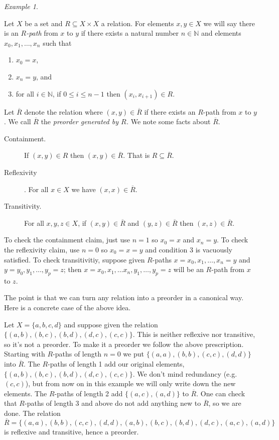 \documentclass{book}
\def\NN{{\mathbb N}}
\def\ss{\subseteq}
\def\ol{\overline}
\theoremstyle{remark}
\newtheorem{example}[subsubsection]{Example}
\theoremstyle{definition}
\begin{document}
\begin{example}\label{ex:preorder generated}

Let $X$ be a set and $R\ss X\times X$ a relation. For elements $x,y\in X$ we will say there is an {\em $R$-path} from $x$ to $y$ if there exists a natural number $n\in\NN$ and elements $x_0,x_1,\ldots,x_n$ such that
\begin{enumerate}
\item $x_0=x$,
\item $x_n=y$, and
\item for all $i\in\NN$, if $0\leq i\leq n-1$ then $(x_i,x_{i+1})\in R$.
\end{enumerate}
Let $\ol{R}$ denote the relation where $(x,y)\in\ol{R}$ if there exists an $R$-path from $x$ to $y$. We call $\ol{R}$ the {\em preorder generated by $R$.} We note some facts about $\ol{R}$.
\begin{description}
\item[Containment.] If $(x,y)\in R$ then $(x,y)\in\ol{R}$. That is $R\ss\ol{R}$.
\item[Reflexivity]. For all $x\in X$ we have $(x,x)\in\ol{R}$. 
\item[Transitivity.] For all $x,y,z\in X$, if $(x,y)\in\ol{R}$ and $(y,z)\in\ol{R}$ then $(x,z)\in\ol{R}$.
\end{description}
To check the containment claim, just use $n=1$ so $x_0=x$ and $x_n=y$. To check the reflexivity claim, use $n=0$ so $x_0=x=y$ and condition 3 is vacuously satisfied. To check transitivitiy, suppose given $R$-paths $x=x_0,x_1,\ldots,x_n=y$ and $y=y_0,y_1,\ldots,y_p=z$; then $x=x_0,x_1,\ldots x_n,y_1,\ldots,y_p=z$ will be an $R$-path from $x$ to $z$.

The point is that we can turn any relation into a preorder in a canonical way. Here is a concrete case of the above idea.

Let $X=\{a,b,c,d\}$ and suppose given the relation $\{(a,b),(b,c),(b,d),(d,c),(c,c)\}$. This is neither reflexive nor transitive, so it's not a preorder. To make it a preorder we follow the above prescription. Starting with $R$-paths of length $n=0$ we put  $\{(a,a), (b,b), (c,c), (d,d)\}$ into $\ol{R}$. The $R$-paths of length 1 add our original elements, $\{(a,b),(b,c),(b,d),(d,c),(c,c)\}$. We don't mind redundancy (e.g. $(c,c)$), but from now on in this example we will only write down the new elements. The $R$-paths of length 2 add $\{(a,c),(a,d)\}$ to $\ol{R}$. One can check that $R$-paths of length 3 and above do not add anything new to $\ol{R}$, so we are done. The relation $$\ol{R}=\{(a,a), (b,b), (c,c), (d,d), (a,b), (b,c), (b,d), (d,c), (a,c), (a,d)\}$$ is reflexive and transitive, hence a preorder.

\end{example}
\end{document}
